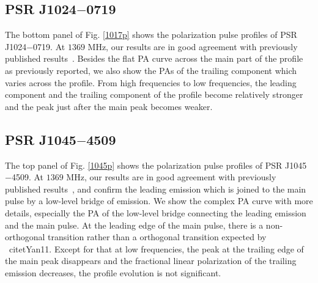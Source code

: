 \documentclass[useAMS,usenatbib]{mn2e}
\begin{document}
%


%
\subsection{PSR J1024$-$0719}

The bottom panel of Fig. \ref{1017p} shows the polarization pulse profiles of 
PSR J1024$-$0719.
%
At $1369$ MHz, our results are in good agreement with previously published
results~\citep{Ord04,Yan11}. 
%
Besides the flat PA curve across the main part of the profile as 
previously reported, we also show the PAs of the trailing component which 
varies across the profile.
%
From high frequencies to low frequencies, the leading component and the 
trailing component of the profile become relatively stronger and the peak 
just after the main peak becomes weaker.



%
\subsection{PSR J1045$-$4509}

The top panel of Fig. \ref{1045p} shows the polarization pulse profiles of 
PSR J1045$-$4509.
%
At $1369$ MHz, our results are in good agreement with previously published
results~\citep{Yan11}, and confirm the leading emission which is joined to 
the main pulse by a low-level bridge of emission.
%
We show the complex PA curve with more details, especially the PA of the 
low-level bridge connecting the leading emission and the main pulse.
%
At the leading edge of the main pulse, there is a non-orthogonal transition 
rather than a orthogonal transition expected by ~citet{Yan11}.
%
Except for that at low frequencies, the peak at the trailing edge of the 
main peak disappears and the fractional linear polarization of the trailing 
emission decreases, the profile evolution is not significant.
\end{document}
